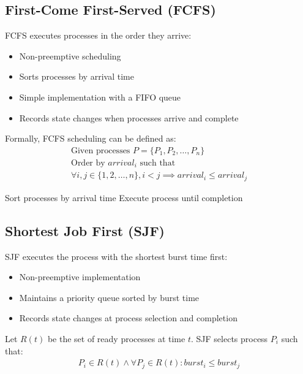 \documentclass[12pt,a4paper]{report}
\begin{document}
\subsection{First-Come First-Served (FCFS)}
FCFS executes processes in the order they arrive:
\begin{itemize}
    \item Non-preemptive scheduling
    \item Sorts processes by arrival time
    \item Simple implementation with a FIFO queue
    \item Records state changes when processes arrive and complete
\end{itemize}

Formally, FCFS scheduling can be defined as:
\begin{align}
\text{Given processes } P = \{P_1, P_2, \ldots, P_n\}\\
\text{Order by } arrival_i \text{ such that }\\
\forall i,j \in \{1,2,\ldots,n\}, i < j \implies arrival_i \leq arrival_j
\end{align}

\begin{algorithm}[H]
\caption{FCFS Algorithm}
\begin{algorithmic}[1]
    \State Sort processes by arrival time
        \State Execute process until completion
    \EndFor
\end{algorithmic}
\end{algorithm}

\subsection{Shortest Job First (SJF)}
SJF executes the process with the shortest burst time first:
\begin{itemize}
    \item Non-preemptive implementation
    \item Maintains a priority queue sorted by burst time
    \item Records state changes at process selection and completion
\end{itemize}

Let $R(t)$ be the set of ready processes at time $t$. SJF selects process $P_i$ such that:
\begin{align}
P_i \in R(t) \wedge \forall P_j \in R(t): burst_i \leq burst_j
\end{align}
\end{document}
